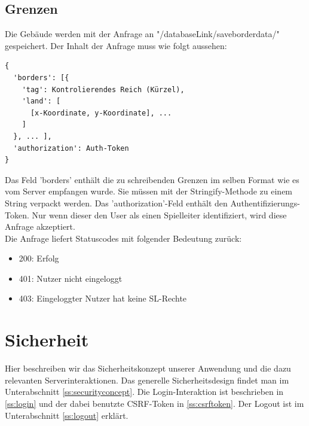 \documentclass[11pt,a4paper,twocolumn]{article}
\begin{document}
\subsection{Grenzen}\label{ss:write_borders}
Die Gebäude werden mit der Anfrage an "/databaseLink/saveborderdata/" gespeichert. Der Inhalt der Anfrage muss wie folgt aussehen:
\begin{lstlisting}
{
  'borders': [{
    'tag': Kontrolierendes Reich (Kürzel),
    'land': [
      [x-Koordinate, y-Koordinate], ...
    ]   
  }, ... ],
  'authorization': Auth-Token
}
\end{lstlisting}
Das Feld 'borders' enthält die zu schreibenden Grenzen im selben Format wie es vom Server empfangen wurde. Sie müssen mit der Stringify-Methode zu einem String verpackt werden. Das 'authorization'-Feld enthält den Authentifizierungs-Token. Nur wenn dieser den User als einen Spielleiter identifiziert, wird diese Anfrage akzeptiert.\\
Die Anfrage liefert Statuscodes mit folgender Bedeutung zurück:
\begin{itemize}
\item 200: Erfolg
\item 401: Nutzer nicht eingeloggt
\item 403: Eingeloggter Nutzer hat keine SL-Rechte
\end{itemize}

\section{Sicherheit}\label{s:security}
Hier beschreiben wir das Sicherheitskonzept unserer Anwendung und die dazu relevanten Serverinteraktionen. Das generelle Sicherheitsdesign findet man im Unterabschnitt \ref{ss:securityconcept}. Die Login-Interaktion ist beschrieben in \ref{ss:login} und der dabei benutzte CSRF-Token in \ref{ss:csrftoken}. Der Logout ist im Unterabschnitt \ref{ss:logout} erklärt. 
\end{document}
